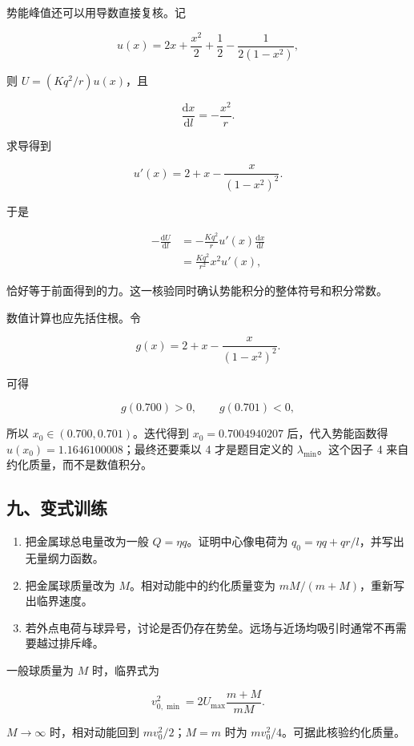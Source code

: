 \documentclass[12pt,a4paper,UTF8]{ctexart}
\newcommand{\tightlist}{\setlength{\itemsep}{0pt}\setlength{\parskip}{0pt}}
\begin{document}
势能峰值还可以用导数直接复核。记

\[u(x)=2x+\frac{x^2}{2}+\frac12-\frac{1}{2(1-x^2)},\]

则 \(U=(Kq^2/r)u(x)\)，且

\[\frac{\mathrm{d}x}{\mathrm{d}l}=-\frac{x^2}{r}.\]

求导得到

\[u'(x)=2+x-\frac{x}{(1-x^2)^2}.\]

于是

\[\begin{aligned}
-\frac{\mathrm{d}U}{\mathrm{d}l}
&=-\frac{Kq^2}{r}u'(x)\frac{\mathrm{d}x}{\mathrm{d}l}\\
&=\frac{Kq^2}{r^2}x^2u'(x),
\end{aligned}\]

恰好等于前面得到的力。这一核验同时确认势能积分的整体符号和积分常数。

数值计算也应先括住根。令

\[g(x)=2+x-\frac{x}{(1-x^2)^2}.\]

可得

\[g(0.700)>0,\qquad g(0.701)<0,\]

所以 \(x_0\in(0.700,0.701)\)。迭代得到 \(x_0=0.7004940207\)
后，代入势能函数得 \(u(x_0)=1.1646100008\)；最终还要乘以 4
才是题目定义的 \(\lambda_{\min}\)。这个因子 4
来自约化质量，而不是数值积分。

\subsection{九、变式训练}\label{ux4e5dux53d8ux5f0fux8badux7ec3-3}

\begin{enumerate}
\def\labelenumi{\arabic{enumi}.}
\tightlist
\item
  把金属球总电量改为一般 \(Q=\eta q\)。证明中心像电荷为
  \(q_0=\eta q+qr/l\)，并写出无量纲力函数。
\item
  把金属球质量改为 \(M\)。相对动能中的约化质量变为
  \(mM/(m+M)\)，重新写出临界速度。
\item
  若外点电荷与球异号，讨论是否仍存在势垒。远场与近场均吸引时通常不再需要越过排斥峰。
\end{enumerate}

一般球质量为 \(M\) 时，临界式为

\[v_{0,\min}^2=2U_{\max}\frac{m+M}{mM}.\]

\(M\to\infty\) 时，相对动能回到 \(mv_0^2/2\)；\(M=m\) 时为
\(mv_0^2/4\)。可据此核验约化质量。

\newpage
\end{document}
